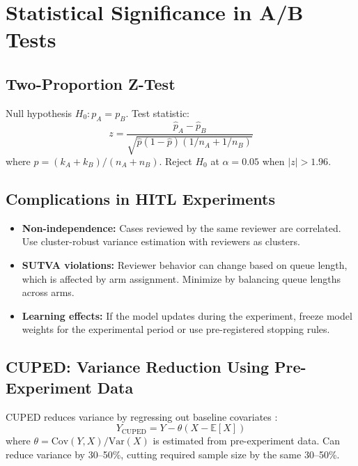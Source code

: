\section{Statistical Significance in A/B Tests}

\subsection{Two-Proportion Z-Test}

Null hypothesis $H_0: p_A = p_B$. Test statistic:
\[
z = \frac{\hat{p}_A - \hat{p}_B}{\sqrt{\hat{p}(1-\hat{p})(1/n_A + 1/n_B)}}
\]
where $\hat{p} = (k_A + k_B)/(n_A + n_B)$. Reject $H_0$ at $\alpha = 0.05$ when $|z| > 1.96$.

\subsection{Complications in HITL Experiments}

\begin{keyconcept}
\begin{itemize}
    \item \textbf{Non-independence:} Cases reviewed by the same reviewer are correlated. Use cluster-robust variance estimation with reviewers as clusters.
    \item \textbf{SUTVA violations:} Reviewer behavior can change based on queue length, which is affected by arm assignment. Minimize by balancing queue lengths across arms.
    \item \textbf{Learning effects:} If the model updates during the experiment, freeze model weights for the experimental period or use pre-registered stopping rules.
\end{itemize}
\end{keyconcept}

\subsection{CUPED: Variance Reduction Using Pre-Experiment Data}

CUPED reduces variance by regressing out baseline covariates \autocite{deng2013cuped}:
\[
Y_{\text{CUPED}} = Y - \theta(X - \mathbb{E}[X])
\]
where $\theta = \text{Cov}(Y, X)/\text{Var}(X)$ is estimated from pre-experiment data. Can reduce variance by 30--50\%, cutting required sample size by the same 30--50\%.

